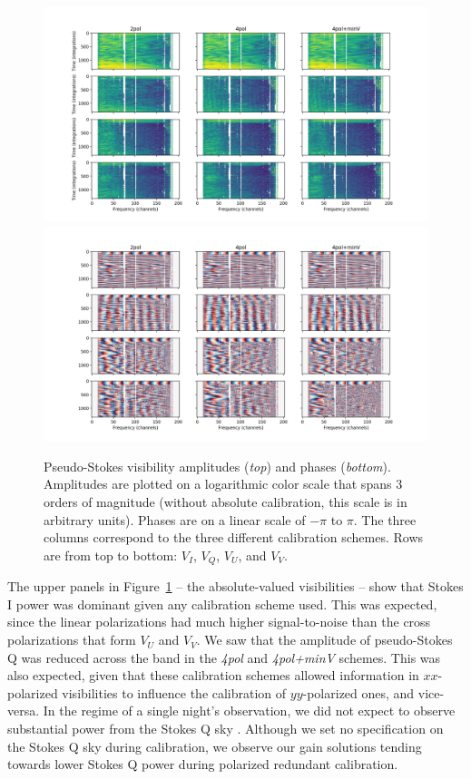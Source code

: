 \begin{figure}
\centering
\includegraphics[scale=0.5]{chapters/polcal/figures/vis.png}
\includegraphics[scale=0.5]{chapters/polcal/figures/phase.png}
\caption[Pseudo-Stokes visibility amplitudes and phases.]{Pseudo-Stokes visibility amplitudes (\textit{top}) and phases (\textit{bottom}). Amplitudes are plotted on a logarithmic color scale that spans 3 orders of magnitude (without absolute calibration, this scale is in arbitrary units). Phases are on a linear scale of $-\pi$ to $\pi$. The three columns correspond to the three different calibration schemes. Rows are from top to bottom: $V_I$, $V_Q$, $V_U$, and $V_V$.}
\label{fig:pseudo-stokes-grid}
\end{figure}

The upper panels in Figure~\ref{fig:pseudo-stokes-grid} -- the absolute-valued visibilities -- show that Stokes I power was dominant given any calibration scheme used. This was expected, since the linear polarizations had much higher signal-to-noise than the cross polarizations that form $V_U$ and $V_V$. We saw that the amplitude of pseudo-Stokes Q was reduced across the band in the \textit{4pol} and \textit{4pol+minV} schemes. This was  also expected, given that these calibration schemes allowed information in $xx$-polarized visibilities to influence the calibration of $yy$-polarized ones, and vice-versa. In the regime of a single night's observation, we did not expect to observe substantial power from the Stokes Q sky \citep{Kohn.16, Lenc.16, Moore.17}. Although we set no specification on the Stokes Q sky during calibration, we observe our gain solutions tending towards lower Stokes Q power during polarized redundant calibration. 

